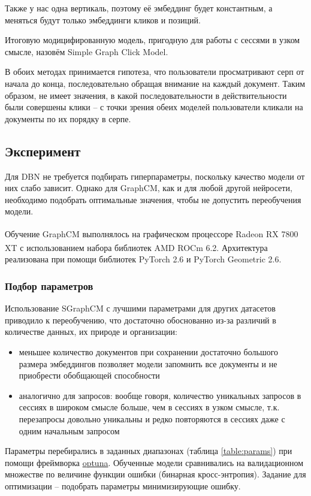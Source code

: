 \documentclass[diploma]{nanolab2015}
\begin{document}
Также у нас одна вертикаль, поэтому её эмбеддинг будет константным, а меняться будут только эмбеддинги кликов и позиций.

Итоговую модицифированную модель, пригодную для работы с сессями в узком смысле, назовём Simple Graph Click Model.

\bigbreak

В обоих методах принимается гипотеза, что пользователи просматривают серп от начала до конца, последовательно обращая внимание на каждый документ. Таким образом, не имеет значения, в какой последовательности в действительности были совершены клики -- с точки зрения обеих моделей пользователи кликали на документы по их порядку в серпе.

\subsection{Эксперимент}
Для DBN не требуется подбирать гиперпараметры, поскольку качество модели от них слабо зависит. Однако для GraphCM, как и для любой другой нейросети, необходимо подобрать оптимальные значения, чтобы не допустить переобучения модели.

Обучение GraphCM выполнялось на графическом процессоре Radeon\textsuperscript{\texttrademark} RX 7800 XT с использованием набора библиотек AMD ROCm\textsuperscript{\texttrademark} 6.2. Архитектура реализована при помощи библиотек PyTorch 2.6 и PyTorch Geometric 2.6.
\subsubsection{Подбор параметров}
Использование SGraphCM с лучшими параметрами для других датасетов приводило к переобучению, что достаточно обоснованно из-за различий в количестве данных, их природе и организации:
\begin{itemize}
    \item меньшее количество документов при сохранении достаточно большого размера эмбеддингов позволяет модели запомнить все документы и не приобрести обобщающей способности
    \item аналогично для запросов: вообще говоря, количество уникальных запросов в сессиях в широком смысле больше, чем в сессиях в узком смысле, т.к. перезапросы довольно уникальны и редко повторяются в сессиях даже с одним начальным запросом
\end{itemize}

Параметры перебирались в заданных диапазонах (таблица \ref{table:params}) при помощи фреймворка \href{https://optuna.org/}{optuna}. Обученные модели сравнивались на валидационном множестве по величине функции ошибки (бинарная кросс-энтропия). Задание для оптимизации -- подобрать параметры минимизирующие ошибку.
\end{document}
